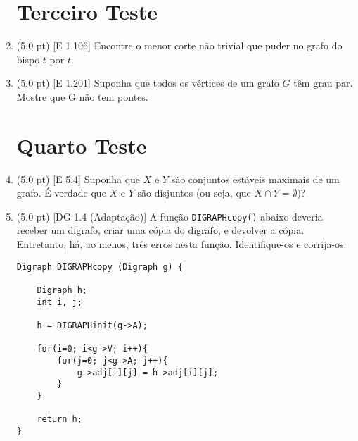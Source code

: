 \documentclass[12pt,a4paper,oneside]{article}
\begin{document}
\begin{enumerate}

	\section*{Terceiro Teste}

	\item (5,0 pt) [E 1.106] Encontre o menor corte não trivial que puder no grafo do bispo $t$-por-$t$.

	\item (5,0 pt) [E 1.201] Suponha que todos os vértices de um grafo $G$ têm grau par. Mostre que G não tem pontes.
	
	\section*{Quarto Teste}

	\item (5,0 pt) [E 5.4] Suponha que $X$ e $Y$ são conjuntos estáveis maximais de um grafo. É verdade que $X$ e $Y$ são disjuntos (ou seja, que $X \cap Y = \emptyset$)?

	\item (5,0 pt) [DG 1.4 (Adaptação)] A função {\tt DIGRAPHcopy()} abaixo deveria receber um digrafo, criar uma cópia do digrafo, e devolver a cópia. Entretanto, há, ao menos, três erros nesta função. Identifique-os e corrija-os.
	
	\begin{lstlisting}
Digraph DIGRAPHcopy (Digraph g) {
	
	Digraph h;
	int i, j;
	
	h = DIGRAPHinit(g->A);
	
	for(i=0; i<g->V; i++){
		for(j=0; j<g->A; j++){
			g->adj[i][j] = h->adj[i][j];
		}	
	}
	
	return h;
}
\end{lstlisting}
	
	\end{enumerate}
\end{document}
